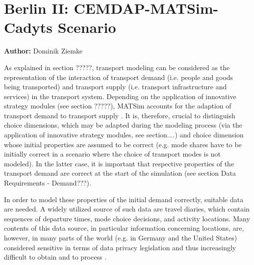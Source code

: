 \section{Berlin II: CEMDAP-MATSim-Cadyts Scenario}
\label{sec:berlinII}
\hfill \textbf{Author:} Dominik Ziemke


As explained in section ?????, transport modeling can be considered as the representation of the interaction of transport demand (i.e. people and goods being transported) and transport supply (i.e. transport infrastructure and services) in the transport system. Depending on the application of innovative strategy modules (see section ?????), MATSim accounts for the adaption of transport demand to transport supply \citep{Balmer2007phd}. It is, therefore, crucial to distinguish choice dimensions, which may be adapted during the modeling process (via the application of innovative strategy modules, see section....) and choice dimension whose initial properties are assumed to be correct (e.g. mode shares have to be initially correct in a scenario where the choice of transport modes is not modeled). In the latter case, it is important that respective properties of the transport demand are correct at the start of the simulation (see section Data Requirements - Demand???).

In order to model these properties of the initial demand correctly, suitable data are needed. A widely utilized source of such data are travel diaries, which contain sequences of departure times, mode choice decisions, and activity locations.
Many contents of this data source, in particular information concerning locations, are, however, in many parts of the world (e.g. in Germany and the United States) considered sensitive in terms of data privacy legislation and thus increasingly difficult to obtain and to process \citep{ ZiemkeNagelBhat2015IntegratingCemdapMatsimTransferabilityTRB}.

